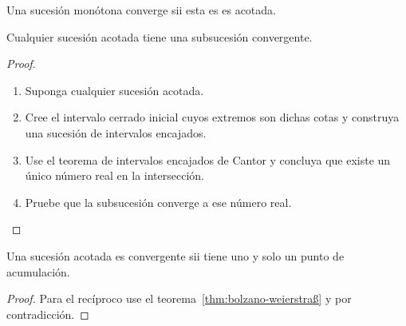 \begin{frame}
  \begin{corollary}
    Una sucesión monótona converge sii esta es es acotada.
  \end{corollary}

  \begin{theorem}
    \label{thm:bolzano-weierstraß}
    Cualquier sucesión acotada tiene una subsucesión convergente.
  \end{theorem}

  \begin{proof}
    \begin{enumerate}
      \item

            Suponga cualquier sucesión acotada.

      \item

            Cree el intervalo cerrado inicial cuyos extremos son
            dichas cotas y construya una sucesión de intervalos
            encajados.

      \item

            Use el teorema de intervalos encajados de Cantor y
            concluya que existe un único número real en la
            intersección.

      \item

            Pruebe que la subsucesión converge a ese número real.
    \end{enumerate}
  \end{proof}

  \begin{theorem}
    Una sucesión acotada es convergente sii tiene uno y solo un punto
    de acumulación.
  \end{theorem}

  \begin{proof}
    Para el recíproco use el teorema~\ref{thm:bolzano-weierstraß} y
    por contradicción.
  \end{proof}
\end{frame}

